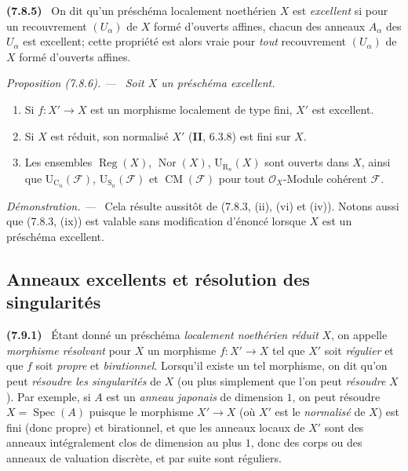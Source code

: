 \documentclass[10pt,oneside]{book}
\makeatletter
\newcommand{\oldpage}[2][]{%
  \setcounter{footnote}{0}%
  \marginpar{\scriptsize\textbf{#1}~|~#2}\ignorespaces}
\newenvironment{env}[1][]{\par\medskip\noindent\textbf{(#1)}\ }{\par}
\newenvironment{proposition}[1][]{%
  \par\medskip\noindent\itshape Proposition (#1). ---\ }{\par}
\newenvironment{proof}{%
  \par\medskip\noindent\textit{Démonstration. ---\ }}{\par}
\newcommand{\EGAReaderTarget}[2]{\hypertarget{#1}{}\@bsphack\begingroup\def\@currentHref{#1}\label{#2}\endgroup\@esphack}
\makeatother
\begin{document}
\begin{env}[7.8.5]
\label{IV.2.s7.8.5-fr}
On dit qu'un préschéma localement noethérien $X$ est \emph{excellent} si pour
un recouvrement $(U_\alpha)$ de $X$ formé d'ouverts affines, chacun des anneaux
$A_\alpha$ des $U_\alpha$ est excellent; cette propriété est alors vraie pour
\emph{tout} recouvrement $(U_\alpha)$ de $X$ formé d'ouverts affines.
\end{env}

\begin{proposition}[7.8.6]
\EGAReaderTarget{ega4.c04.prop.7-8-6}{IV.2.s7.8.6-fr}
Soit $X$ un préschéma excellent.
\begin{enumerate}
\item[\emph{(i)}] Si $f:X'\to X$ est un morphisme localement de type fini, $X'$ est
excellent.

\oldpage[IV-2]{218}

\item[\emph{(ii)}] Si $X$ est réduit, son normalisé $X'$ (\textbf{II}, 6.3.8) est fini
sur $X$.
\item[\emph{(iii)}] Les ensembles $\operatorname{Reg}(X)$, $\operatorname{Nor}(X)$,
$\mathrm U_{\mathrm R_n}(X)$ sont ouverts dans $X$, ainsi que
$\mathrm U_{\mathrm C_n}(\mathcal F)$, $\mathrm U_{\mathrm S_n}(\mathcal F)$
et $\operatorname{CM}(\mathcal F)$ pour tout $\mathcal O_X$-Module cohérent
$\mathcal F$.
\end{enumerate}
\end{proposition}

\begin{proof}
Cela résulte aussitôt de (7.8.3, (ii), (vi) et (iv)). Notons aussi que (7.8.3,
(ix)) est valable sans modification d'énoncé lorsque $X$ est un préschéma
excellent.
\end{proof}

\subsection{Anneaux excellents et résolution des singularités}
\label{subsection:IV.2.7.9-fr}

\begin{env}[7.9.1]
\label{IV.2.s7.9.1-fr}
Étant donné un préschéma \emph{localement noethérien réduit} $X$, on appelle
\emph{morphisme résolvant} pour $X$ un morphisme $f:X'\to X$ tel que $X'$ soit
\emph{régulier} et que $f$ soit \emph{propre} et \emph{birationnel}. Lorsqu'il
existe un tel morphisme, on dit qu'on peut \emph{résoudre les singularités} de
$X$ (ou plus simplement que l'on peut \emph{résoudre} $X$). Par exemple, si
$A$ est un \emph{anneau japonais} de dimension $1$, on peut résoudre
$X=\operatorname{Spec}(A)$ puisque le morphisme $X'\to X$ (où $X'$ est le
\emph{normalisé} de $X$) est fini (donc propre) et birationnel, et que les
anneaux locaux de $X'$ sont des anneaux intégralement clos de dimension au plus $1$,
donc des corps ou des anneaux de valuation discrète, et par suite sont réguliers.
\end{env}
\end{document}
